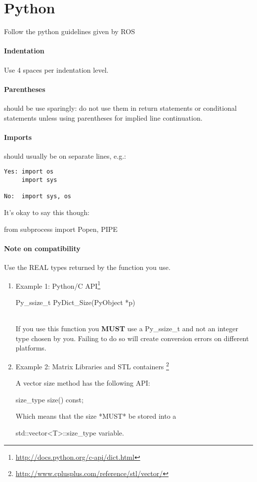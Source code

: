 \section{Python}
Follow the python guidelines given by ROS \url{}

\paragraph{Indentation} Use 4 spaces per indentation level.

\paragraph{Parentheses} should be use sparingly: do not use them in return statements or conditional statements unless using parentheses for implied line continuation. %

\paragraph{Imports} should usually be on separate lines, e.g.:
\begin{verbatim}
Yes: import os
     import sys

No:  import sys, os
\end{verbatim}

It's okay to say this though:\\
\begin{tt}
from subprocess import Popen, PIPE
\end{tt}

\paragraph{Note on compatibility}
Use the REAL types returned by the function you use.
\begin{enumerate}
\item Example 1: Python/C API\footnote{\url{http://docs.python.org/c-api/dict.html}}\\
\begin{tt}Py\_ssize\_t PyDict\_Size(PyObject *p)\end{tt}\\
If you use this function you \textbf{MUST} use a Py\_ssize\_t and not an
integer type chosen by you.
Failing to do so will create conversion errors on different platforms.

\item Example 2: Matrix Libraries and STL containers
\footnote{\url{http://www.cplusplus.com/reference/stl/vector/}}

A vector size method has the following API:
\begin{tt}size\_type size() const;\end{tt}

Which means that the size *MUST* be stored into a
\begin{tt}std::vector<T>::size\_type variable.\end{tt}
\end{enumerate}



